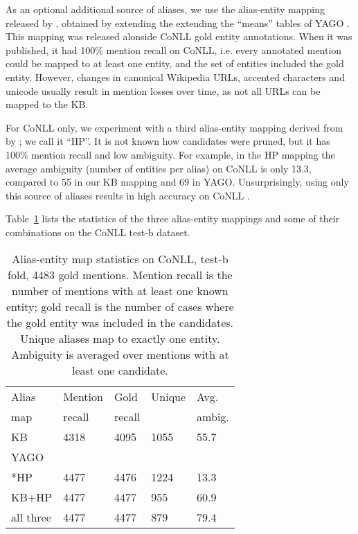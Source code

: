 As an optional additional source of aliases, we use the alias-entity mapping released
by , obtained by extending the extending the
``means'' tables of YAGO \cite{hoffart2013yago2}. This mapping was released alonside
CoNLL gold entity annotations. When it was
published, it had 100\% mention recall on CoNLL, i.e. every annotated mention
could be mapped to at least one entity, and the set of entities included the gold entity. 
However, changes in canonical Wikipedia URLs, accented characters and
unicode usually result in mention losses over time, as not all URLs can be mapped to the KB.

For CoNLL only, we experiment with a third alias-entity mapping derived 
from \cite{Hoffart2011} by ; we call it ``HP''.  
It is not known how candidates were pruned, but it has 100\% mention recall
and low ambiguity. For example, in the HP mapping the average ambiguity (number of
entities per alias) on CoNLL is only 13.3, compared to 55 in our KB mapping
and 69 in YAGO. Unsurprisingly, using only this source of aliases results in
high accuracy on CoNLL  \cite{Pershina2015,YamadaS0T16}.  

Table~\ref{tab:AliasTable} lists the statistics of the three alias-entity mappings
 and some of their combinations on the CoNLL test-b dataset. 

\begin{table}
  \centering
  \begin{tabular}{l|l|l|l|l}
    Alias & Mention &   Gold & Unique & Avg.  \\
    map          & recall  & recall &        & ambig. \\
    \hline
    KB     & 4318 & 4095 & 1055   & 55.7  \\
    YAGO & & & & \\
    *HP & 4477 & 4476   & 1224   & 13.3   \\
    KB+HP  & 4477 &  4477 & 955    & 60.9   \\
    all three& 4477    & 4477   & 879    & 79.4       
  \end{tabular}
  \caption{Alias-entity map statistics on CoNLL, test-b
    fold, 4483 gold mentions.  Mention recall is the number of
    mentions with at least one known entity; gold recall is the number
    of cases where the gold entity was included in the candidates.
    Unique aliases map to exactly one entity.  Ambiguity is averaged over
    mentions with at least one candidate. }
  \label{tab:AliasTable}
\end{table}


